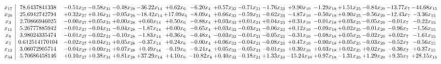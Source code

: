 \documentclass[9pt]{article}
\begin{document}
 \[\begin{array}{c| c c@{\hskip 2pt} c@{\hskip 2pt} c@{\hskip 2pt} c@{\hskip 2pt} c@{\hskip 2pt} c@{\hskip 2pt} c@{\hskip 2pt} c@{\hskip 2pt} c@{\hskip 2pt} c@{\hskip 2pt} c@{\hskip 2pt} c@{\hskip 2pt} c@{\hskip 2pt} c@{\hskip 2pt} c@{\hskip 2pt} }
 x_{17}   &  78.6437841338 & -0.51 x_{27} & -0.58 x_{31} & -0.48 x_{28} & -36.22 x_{14} & +  0.62 x_{6} & -6.20 x_{4} & +  0.57 x_{32} & -0.71 x_{21} & -1.76 x_{23} & +  9.90 x_{10} & -1.29 x_{18} & +  1.51 x_{25} & -0.84 x_{20} & -13.77 x_{7} & -44.68 x_{15}\\
 x_{29}   &  25.6942742794 & +  0.32 x_{27} & +  0.16 x_{31} & -0.05 x_{28} & -18.42 x_{14} & + 17.09 x_{6} & -8.09 x_{4} & +  0.66 x_{32} & -0.59 x_{21} & -0.62 x_{23} & -4.87 x_{10} & -0.50 x_{18} & +  0.90 x_{25} & -0.56 x_{20} & -12.43 x_{7} & -3.36 x_{15}\\
 x_{3}   &  2.70866946025 & -0.00 x_{27} & +  0.05 x_{31} & +  0.00 x_{28} & +  0.60 x_{14} & +  0.50 x_{6} & -0.88 x_{4} & +  0.03 x_{32} & +  0.01 x_{21} & +  0.04 x_{23} & +  0.31 x_{10} & -0.01 x_{18} & +  0.03 x_{25} & -0.05 x_{20} & -0.01 x_{7} & -0.22 x_{15}\\
 x_{11}   &  5.26777885942 & -0.01 x_{27} & -0.04 x_{31} & -0.04 x_{28} & -1.87 x_{14} & +  0.00 x_{6} & -0.65 x_{4} & +  0.03 x_{32} & -0.03 x_{21} & -0.06 x_{23} & +  0.12 x_{10} & -0.09 x_{18} & +  0.02 x_{25} & -0.01 x_{20} & -0.96 x_{7} & -1.56 x_{15}\\
 x_{8}   &  3.98024335474 & -0.01 x_{27} & -0.02 x_{31} & -0.10 x_{28} & -1.83 x_{14} & +  0.36 x_{6} & -0.48 x_{4} & -0.03 x_{32} & -0.01 x_{21} & -0.05 x_{23} & -0.31 x_{10} & -0.08 x_{18} & +  0.05 x_{25} & -0.02 x_{20} & +  0.02 x_{7} & -1.61 x_{15}\\
 x_{5}   &  0.612514170104 & -0.02 x_{27} & +  0.04 x_{31} & +  0.05 x_{28} & -0.37 x_{14} & +  0.24 x_{6} & -0.00 x_{4} & +  0.06 x_{32} & -0.04 x_{21} & -0.08 x_{23} & +  0.47 x_{10} & -0.00 x_{18} & +  0.05 x_{25} & -0.03 x_{20} & -0.52 x_{7} & -0.56 x_{15}\\
 x_{12}   &  3.06072905714 & -0.04 x_{27} & +  0.00 x_{31} & +  0.07 x_{28} & +  0.49 x_{14} & -0.19 x_{6} & -0.24 x_{4} & +  0.05 x_{32} & -0.05 x_{21} & -0.01 x_{23} & +  0.30 x_{10} & +  0.03 x_{18} & +  0.02 x_{25} & +  0.02 x_{20} & -0.36 x_{7} & +  0.37 x_{15}\\
 x_{34}   &  5.70686458146 & +  0.10 x_{27} & +  0.38 x_{31} & +  0.81 x_{28} & + 37.29 x_{14} & +  4.10 x_{6} & -10.82 x_{4} & +  0.40 x_{32} & -0.18 x_{21} & +  1.33 x_{23} & -15.24 x_{10} & +  0.97 x_{18} & -1.31 x_{25} & +  1.29 x_{20} & +  9.35 x_{7} & + 28.15 x_{15}\\

\end{array}\]
\end{document}
